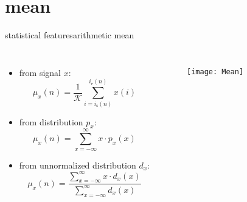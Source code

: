     \section[mean]{mean}
        \begin{frame}{statistical features}{arithmetic mean}
            \vspace{-7mm}
            \begin{columns}
            \begin{itemize}
                \item   from signal $x$:
                \vspace{-4mm}
                \begin{equation*}\label{eq:arith_mean}
                    \mu_x(n) = \frac{1}{\mathcal{K}}\sum\limits_{i=i_{\mathrm{s}}(n)}^{i_{\mathrm{e}}(n)}{x(i)} 
                \end{equation*}
                \pause
                \vspace{-4mm}
                \item   from distribution $p_x$:
                \begin{equation*}\label{eq:arith_mean2}
                    \mu_x(n) = \sum\limits_{x=-\infty}^{\infty}{x\cdot p_x(x)} 
                \end{equation*}
                \pause
                \vspace{-4mm}
                \item   from unnormalized distribution $d_x$:
                \begin{equation*}\label{eq:arith_mean3}
                    \mu_x(n) = \frac{\sum\limits_{x=-\infty}^{\infty}{x\cdot d_x(x)}}{\sum\limits_{x=-\infty}^{\infty}{d_x(x)}} 
                \end{equation*}
            \end{itemize}
            \vspace{-5mm}
                
            \begin{figure}
                \texttt{[image: Mean]}
            \end{figure}
            \end{columns}
        \end{frame}
